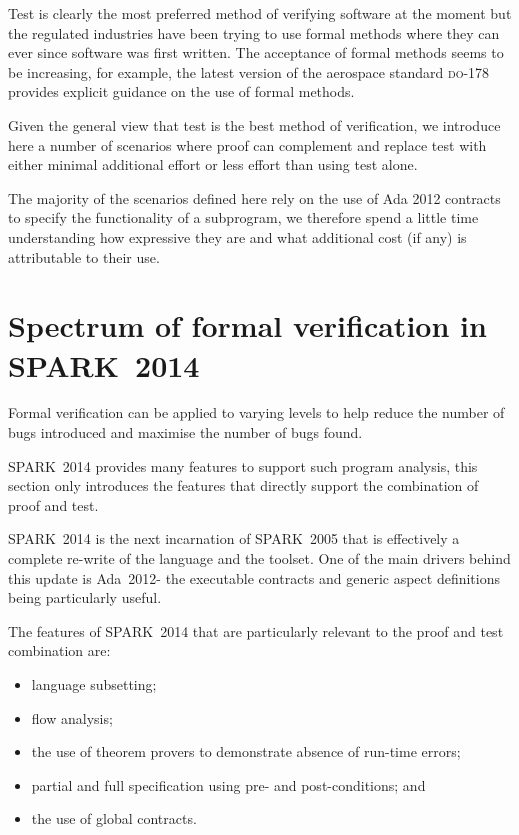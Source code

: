 \documentclass{llncs}
\newcommand{\DO}{\textsc{do-178}\xspace}
\newcommand{\oldspark}{SPARK~2005\xspace}
\newcommand{\newspark}{SPARK~2014\xspace}
\newcommand{\adatwtw}{Ada~2012\xspace}
\begin{document}
Test is clearly the most preferred method of verifying software at the
moment but the regulated industries have been trying to use formal
methods where they can ever since software was first written. The
acceptance of formal methods seems to be increasing, for example, the
latest version of the aerospace standard \DO provides explicit
guidance on the use of formal methods.

Given the general view that test is the best method of verification,
we introduce here a number of scenarios where proof can complement and
replace test with either minimal additional effort or less effort than
using test alone.

The majority of the scenarios defined here rely on the use of Ada 2012
contracts to specify the functionality of a subprogram, we therefore
spend a little time understanding how expressive they are and what
additional cost (if any) is attributable to their use.


\section{Spectrum of formal verification in \newspark}

Formal verification can be applied to varying levels to help reduce
the number of bugs introduced and maximise the number of bugs found.

\newspark provides many features to support such program analysis,
this section only introduces the features that directly support the
combination of proof and test.

\newspark is the next incarnation of \oldspark \cite{sparkbook2012}
that is effectively a complete re-write of the language and the
toolset. One of the main drivers behind this update is \adatwtw - the
executable contracts and generic aspect definitions being particularly
useful.

The features of \newspark that are particularly relevant to the proof
and test combination are:
\begin{itemize}
\item language subsetting;
\item flow analysis;
\item the use of theorem provers to demonstrate absence of run-time
  errors;
\item partial and full specification using pre- and post-conditions;
  and
\item the use of global contracts.
\end{itemize}
\end{document}
